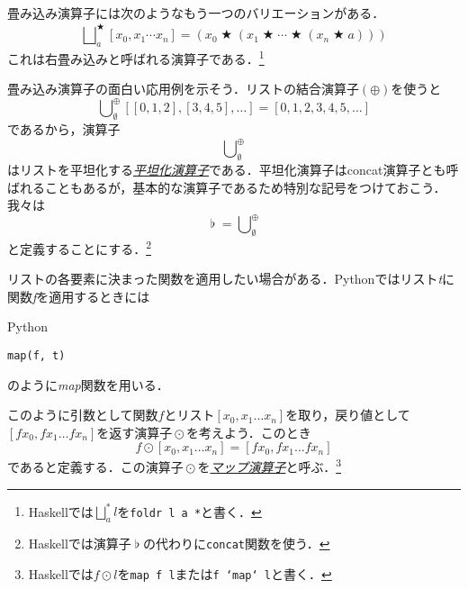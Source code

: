\documentclass[a5paper,draft]{jsbook}
\newcommand{\programminglanguage}[1]{\textsf{#1}}
\newcommand{\haskell}{\programminglanguage{Haskell}}
\newcommand{\python}{\programminglanguage{Python}}
\newcommand{\keyword}[1]{{\underline{\emph{#1}}}}
\newcommand{\code}[1]{\texttt{#1}}
\newenvironment{pythoncode}{\begin{itembox}[r]{\python}}{\end{itembox}}
\newcommand{\pthnId}[1]{\textit{#1}}
\DeclareMathOperator*{\mathFold}{\bigcup}
\DeclareMathOperator*{\mathFoldRight}{\bigsqcup}
\newcommand{\mathBinaryOperator}[1]{\operatorname{#1}}
\newcommand{\mathAnyBinaryOperator}{\mathBinaryOperator{\bigstar}}
\newcommand{\mathAppend}{\oplus}
\DeclareMathOperator{\hsklConcat}{\flat}
\DeclareMathOperator{\hsklMap}{\odot}
\newcommand{\hsklEmptyList}{\emptyset}
\begin{document}
畳み込み演算子には次のようなもう一つのバリエーションがある．
\begin{equation}
\mathFoldRight^{\mathAnyBinaryOperator}_{a}[x_0,x_1\dotsb x_n]=\left(x_0\mathAnyBinaryOperator\left(x_1\mathAnyBinaryOperator\dotsb\mathAnyBinaryOperator\left(x_n\mathAnyBinaryOperator a\right)\right)\right)
\end{equation}
これは右畳み込みと呼ばれる演算子である．\footnote{\haskell では$\mathFoldRight^{*}_{a}l$を\code{foldr l a *}と書く．}

畳み込み演算子の面白い応用例を示そう．リストの結合演算子$(\mathAppend)$を使うと
\begin{equation}
\mathFold_\hsklEmptyList^\mathAppend[[0,1,2],[3,4,5],\dots]=[0,1,2,3,4,5,\dots]
\end{equation}
であるから，演算子
\begin{equation}
\mathFold_\hsklEmptyList^\mathAppend
\end{equation}
はリストを平坦化する\keyword{平坦化演算子}である．平坦化演算子はconcat演算子とも呼ばれることもあるが，基本的な演算子であるため特別な記号をつけておこう．我々は
\begin{equation}
\hsklConcat=\mathFold_\hsklEmptyList^\mathAppend
\end{equation}
と定義することにする．\footnote{\haskell では演算子$\hsklConcat$の代わりに\code{concat}関数を使う．}

リストの各要素に決まった関数を適用したい場合がある．\python ではリスト\pthnId{t}に関数\pthnId{f}を適用するときには
\begin{pythoncode}
\begin{verbatim}
map(f, t)
\end{verbatim}
\end{pythoncode}
のように\pthnId{map}関数を用いる．

このように引数として関数$f$とリスト$[x_0,x_1\dots x_n]$を取り，戻り値として$[fx_0,fx_1\dots fx_n]$を返す演算子$\hsklMap$を考えよう．このとき
\begin{equation}
f\hsklMap[x_0,x_1\dots x_n]=[fx_0,fx_1\dots fx_n]
\end{equation}
であると定義する．この演算子$\hsklMap$を\keyword{マップ演算子}と呼ぶ．\footnote{\haskell では$f\hsklMap l$を\code{map f l}または\code{f `map` l}と書く．}
\end{document}
